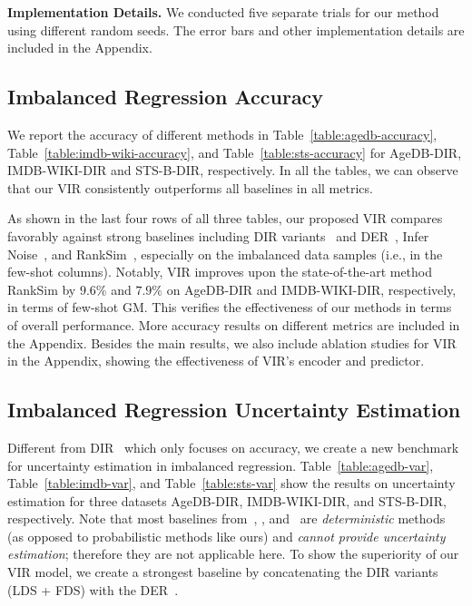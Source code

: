 {\textbf{Implementation Details.} {We conducted five separate trials for our method using different random seeds. The error bars and other implementation details are included in the Appendix.} 

\subsection{Imbalanced Regression Accuracy}\label{ssec:res_acc}
{We report the accuracy of different methods in Table~\ref{table:agedb-accuracy}, Table~\ref{table:imdb-wiki-accuracy}, and Table~\ref{table:sts-accuracy} for AgeDB-DIR, IMDB-WIKI-DIR and STS-B-DIR, respectively. In all the tables, we can observe that our VIR consistently outperforms all baselines in all metrics.}


{As shown in the last four rows of all three tables, our proposed VIR compares favorably against strong baselines including DIR variants~\citep{DIR} and DER~\citep{DER}, Infer Noise~\citep{TFuncertainty}, and RankSim~\citep{RankSim}, especially on the imbalanced data samples (i.e., in the few-shot columns). Notably, VIR improves upon the state-of-the-art method RankSim by $9.6\%$ and $7.9\%$ on AgeDB-DIR and IMDB-WIKI-DIR, respectively, in terms of few-shot GM. This verifies the effectiveness of our methods in terms of overall performance.}
%
{More accuracy results on different metrics are included in the Appendix. Besides the main results, {we also include ablation studies for VIR in the Appendix,} showing the effectiveness of VIR's encoder and predictor.} 
%
\subsection{Imbalanced Regression Uncertainty Estimation}\label{ssec:res_var}
{Different from DIR~\citep{DIR} which only focuses on accuracy, we create a new benchmark for uncertainty estimation in imbalanced regression. Table~\ref{table:agedb-var}, Table~\ref{table:imdb-var}, and Table~\ref{table:sts-var} show the results on uncertainty estimation for three datasets AgeDB-DIR, IMDB-WIKI-DIR, and STS-B-DIR, respectively. Note that most baselines from~, , and~ are \emph{deterministic} methods (as opposed to probabilistic methods like ours) and \emph{cannot provide uncertainty estimation}; therefore they are not applicable here. To show the superiority of our VIR model, we create a strongest baseline by concatenating the DIR variants (LDS + FDS) with the DER~\citep{DER}.}
 
}
